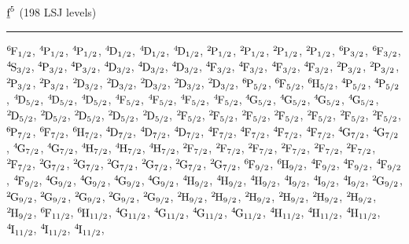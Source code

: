 \begin{mdframed}
\begin{center}
$\forb^{5}$
(198 LSJ levels)
\vspace{0.25cm}
\hrule
\vspace{0.25cm}

$\LSJterm{6}{F}{1/2}$, $\LSJterm{4}{P}{1/2}$, $\LSJterm{4}{P}{1/2}$, $\LSJterm{4}{D}{1/2}$, $\LSJterm{4}{D}{1/2}$, $\LSJterm{4}{D}{1/2}$, $\LSJterm{2}{P}{1/2}$, $\LSJterm{2}{P}{1/2}$, $\LSJterm{2}{P}{1/2}$, $\LSJterm{2}{P}{1/2}$, $\LSJterm{6}{P}{3/2}$, $\LSJterm{6}{F}{3/2}$, $\LSJterm{4}{S}{3/2}$, $\LSJterm{4}{P}{3/2}$, $\LSJterm{4}{P}{3/2}$, $\LSJterm{4}{D}{3/2}$, $\LSJterm{4}{D}{3/2}$, $\LSJterm{4}{D}{3/2}$, $\LSJterm{4}{F}{3/2}$, $\LSJterm{4}{F}{3/2}$, $\LSJterm{4}{F}{3/2}$, $\LSJterm{4}{F}{3/2}$, $\LSJterm{2}{P}{3/2}$, $\LSJterm{2}{P}{3/2}$, $\LSJterm{2}{P}{3/2}$, $\LSJterm{2}{P}{3/2}$, $\LSJterm{2}{D}{3/2}$, $\LSJterm{2}{D}{3/2}$, $\LSJterm{2}{D}{3/2}$, $\LSJterm{2}{D}{3/2}$, $\LSJterm{2}{D}{3/2}$, $\LSJterm{6}{P}{5/2}$, $\LSJterm{6}{F}{5/2}$, $\LSJterm{6}{H}{5/2}$, $\LSJterm{4}{P}{5/2}$, $\LSJterm{4}{P}{5/2}$, $\LSJterm{4}{D}{5/2}$, $\LSJterm{4}{D}{5/2}$, $\LSJterm{4}{D}{5/2}$, $\LSJterm{4}{F}{5/2}$, $\LSJterm{4}{F}{5/2}$, $\LSJterm{4}{F}{5/2}$, $\LSJterm{4}{F}{5/2}$, $\LSJterm{4}{G}{5/2}$, $\LSJterm{4}{G}{5/2}$, $\LSJterm{4}{G}{5/2}$, $\LSJterm{4}{G}{5/2}$, $\LSJterm{2}{D}{5/2}$, $\LSJterm{2}{D}{5/2}$, $\LSJterm{2}{D}{5/2}$, $\LSJterm{2}{D}{5/2}$, $\LSJterm{2}{D}{5/2}$, $\LSJterm{2}{F}{5/2}$, $\LSJterm{2}{F}{5/2}$, $\LSJterm{2}{F}{5/2}$, $\LSJterm{2}{F}{5/2}$, $\LSJterm{2}{F}{5/2}$, $\LSJterm{2}{F}{5/2}$, $\LSJterm{2}{F}{5/2}$, $\LSJterm{6}{P}{7/2}$, $\LSJterm{6}{F}{7/2}$, $\LSJterm{6}{H}{7/2}$, $\LSJterm{4}{D}{7/2}$, $\LSJterm{4}{D}{7/2}$, $\LSJterm{4}{D}{7/2}$, $\LSJterm{4}{F}{7/2}$, $\LSJterm{4}{F}{7/2}$, $\LSJterm{4}{F}{7/2}$, $\LSJterm{4}{F}{7/2}$, $\LSJterm{4}{G}{7/2}$, $\LSJterm{4}{G}{7/2}$, $\LSJterm{4}{G}{7/2}$, $\LSJterm{4}{G}{7/2}$, $\LSJterm{4}{H}{7/2}$, $\LSJterm{4}{H}{7/2}$, $\LSJterm{4}{H}{7/2}$, $\LSJterm{2}{F}{7/2}$, $\LSJterm{2}{F}{7/2}$, $\LSJterm{2}{F}{7/2}$, $\LSJterm{2}{F}{7/2}$, $\LSJterm{2}{F}{7/2}$, $\LSJterm{2}{F}{7/2}$, $\LSJterm{2}{F}{7/2}$, $\LSJterm{2}{G}{7/2}$, $\LSJterm{2}{G}{7/2}$, $\LSJterm{2}{G}{7/2}$, $\LSJterm{2}{G}{7/2}$, $\LSJterm{2}{G}{7/2}$, $\LSJterm{2}{G}{7/2}$, $\LSJterm{6}{F}{9/2}$, $\LSJterm{6}{H}{9/2}$, $\LSJterm{4}{F}{9/2}$, $\LSJterm{4}{F}{9/2}$, $\LSJterm{4}{F}{9/2}$, $\LSJterm{4}{F}{9/2}$, $\LSJterm{4}{G}{9/2}$, $\LSJterm{4}{G}{9/2}$, $\LSJterm{4}{G}{9/2}$, $\LSJterm{4}{G}{9/2}$, $\LSJterm{4}{H}{9/2}$, $\LSJterm{4}{H}{9/2}$, $\LSJterm{4}{H}{9/2}$, $\LSJterm{4}{I}{9/2}$, $\LSJterm{4}{I}{9/2}$, $\LSJterm{4}{I}{9/2}$, $\LSJterm{2}{G}{9/2}$, $\LSJterm{2}{G}{9/2}$, $\LSJterm{2}{G}{9/2}$, $\LSJterm{2}{G}{9/2}$, $\LSJterm{2}{G}{9/2}$, $\LSJterm{2}{G}{9/2}$, $\LSJterm{2}{H}{9/2}$, $\LSJterm{2}{H}{9/2}$, $\LSJterm{2}{H}{9/2}$, $\LSJterm{2}{H}{9/2}$, $\LSJterm{2}{H}{9/2}$, $\LSJterm{2}{H}{9/2}$, $\LSJterm{2}{H}{9/2}$, $\LSJterm{6}{F}{11/2}$, $\LSJterm{6}{H}{11/2}$, $\LSJterm{4}{G}{11/2}$, $\LSJterm{4}{G}{11/2}$, $\LSJterm{4}{G}{11/2}$, $\LSJterm{4}{G}{11/2}$, $\LSJterm{4}{H}{11/2}$, $\LSJterm{4}{H}{11/2}$, $\LSJterm{4}{H}{11/2}$, $\LSJterm{4}{I}{11/2}$, $\LSJterm{4}{I}{11/2}$, $\LSJterm{4}{I}{11/2}$, 
\end{center}
\end{mdframed}
